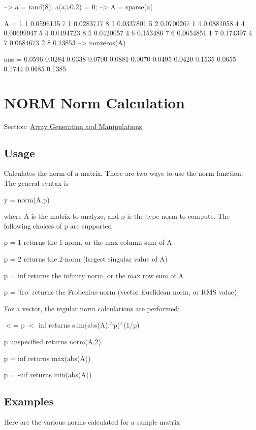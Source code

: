 \begin{DoxyVerbInclude}
--> a = rand(8); a(a>0.2) = 0;
--> A = sparse(a)

A = 
 1 1 0.0596135
 7 1 0.0283717
 8 1 0.0337801
 5 2 0.0700267
 1 4 0.0881058
 4 4 0.00699947
 5 4 0.0494723
 8 5 0.0420057
 4 6 0.153486
 7 6 0.0654851
 1 7 0.174397
 4 7 0.0684673
 2 8 0.13853
--> nonzeros(A)

ans = 
    0.0596 
    0.0284 
    0.0338 
    0.0700 
    0.0881 
    0.0070 
    0.0495 
    0.0420 
    0.1535 
    0.0655 
    0.1744 
    0.0685 
    0.1385 
\end{DoxyVerbInclude}
 \hypertarget{array_norm}{}\section{N\-O\-R\-M Norm Calculation}\label{array_norm}
Section\-: \hyperlink{sec_array}{Array Generation and Manipulations} \hypertarget{vtkwidgets_vtkxyplotwidget_Usage}{}\subsection{Usage}\label{vtkwidgets_vtkxyplotwidget_Usage}
Calculates the norm of a matrix. There are two ways to use the {\ttfamily norm} function. The general syntax is \begin{DoxyVerb}   y = norm(A,p)
\end{DoxyVerb}
 where {\ttfamily A} is the matrix to analyze, and {\ttfamily p} is the type norm to compute. The following choices of {\ttfamily p} are supported 
\begin{DoxyItemize}
\item {\ttfamily p = 1} returns the 1-\/norm, or the max column sum of A  
\item {\ttfamily p = 2} returns the 2-\/norm (largest singular value of A)  
\item {\ttfamily p = inf} returns the infinity norm, or the max row sum of A  
\item {\ttfamily p = 'fro'} returns the Frobenius-\/norm (vector Euclidean norm, or R\-M\-S value)  
\end{DoxyItemize}For a vector, the regular norm calculations are performed\-: 
\begin{DoxyItemize}
\item { $<$= p $<$ inf} returns {\ttfamily sum(abs(\-A).$^\wedge$p)$^\wedge$(1/p)}  
\item {\ttfamily p} unspecified returns {\ttfamily norm(\-A,2)}  
\item {\ttfamily p = inf} returns max(abs(\-A))  
\item {\ttfamily p = -\/inf} returns min(abs(\-A))  
\end{DoxyItemize}\hypertarget{variables_matrix_Examples}{}\subsection{Examples}\label{variables_matrix_Examples}
Here are the various norms calculated for a sample matrix


